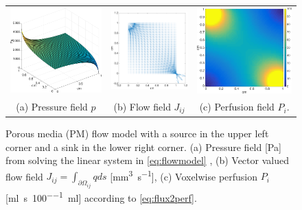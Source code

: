 \documentclass[paper=a4, fontsize=11pt,parskip=half,headings=small]{scrartcl}
\newcommand{\siFmm}{\milli\meter\cubed\per\second}
\newcommand{\siPml}{\milli\litre\per\second\per100\milli\litre}
\begin{document}
		\begin{figure}[H]
		\centering
		\begin{tabular}{c c c}
			\includegraphics[width=.3\textwidth]{figs/pressure.eps} & \includegraphics[width=.3\textwidth]{figs/flowQuiver.eps} & \includegraphics[width=.3\textwidth]{figs/perfusion.eps}\\
			(a) Pressure field $p$ & (b) Flow field $J_{ij}$ & (c) Perfusion field $P_i$.
		\end{tabular}
    	\caption{Porous media (PM) flow model with a source in the upper left corner and a sink in the lower right corner. (a) Pressure field [\si{\pascal}] from solving the linear system in \eqref{eq:flowmodel} , (b) Vector valued flow field $J_{ij} = \int_{\partial \Omega_{ij}}q ds$ [\si{\siFmm}], (c) Voxelwise perfusion $P_i$ [\si{\siPml}] according to \eqref{eq:flux2perf}.}
	        \label{fig:flowpressureperfusion}
	\end{figure}
\end{document}
